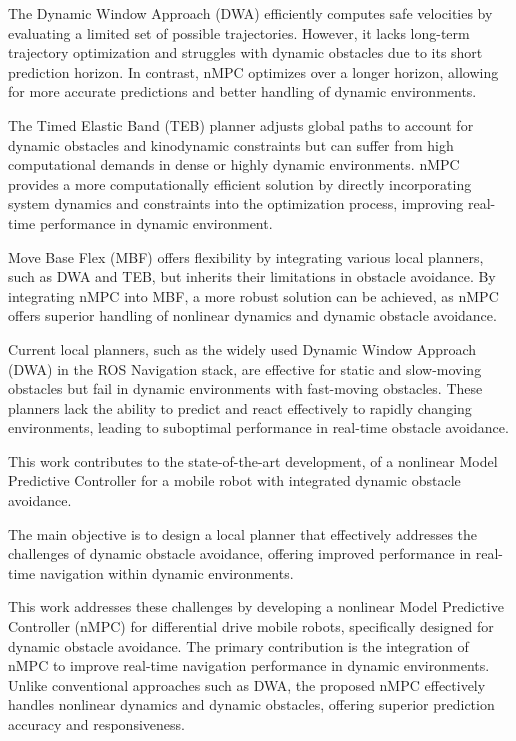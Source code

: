 \documentclass[conference]{IEEEtran}
\begin{document}
The Dynamic Window Approach (DWA) efficiently computes safe velocities by evaluating a limited set of possible trajectories. However, it lacks long-term trajectory optimization and struggles with dynamic obstacles due to its short prediction horizon. In contrast, nMPC optimizes over a longer horizon, allowing for more accurate predictions and better handling of dynamic environments.

The Timed Elastic Band (TEB) planner adjusts global paths to account for dynamic obstacles and kinodynamic constraints but can suffer from high computational demands in dense or highly dynamic environments. nMPC provides a more computationally efficient solution by directly incorporating system dynamics and constraints into the optimization process, improving real-time performance in dynamic environment.

Move Base Flex (MBF) offers flexibility by integrating various local planners, such as DWA and TEB, but inherits their limitations in obstacle avoidance. By integrating nMPC into MBF, a more robust solution can be achieved, as nMPC offers superior handling of nonlinear dynamics and dynamic obstacle avoidance.

Current local planners, such as the widely used Dynamic Window Approach (DWA) in the ROS Navigation stack, are effective for static and slow-moving obstacles but fail in dynamic environments with fast-moving obstacles. These planners lack the ability to predict and react effectively to rapidly changing environments, leading to suboptimal performance in real-time obstacle avoidance.

This work contributes to the state-of-the-art development, of a nonlinear Model Predictive Controller for a mobile robot with integrated dynamic obstacle avoidance. 

The main objective is to design a local planner that effectively addresses the challenges of dynamic obstacle avoidance, offering improved performance in real-time navigation within dynamic environments.

This work addresses these challenges by developing a nonlinear Model Predictive Controller (nMPC) for differential drive mobile robots, specifically designed for dynamic obstacle avoidance. The primary contribution is the integration of nMPC to improve real-time navigation performance in dynamic environments. Unlike conventional approaches such as DWA, the proposed nMPC effectively handles nonlinear dynamics and dynamic obstacles, offering superior prediction accuracy and responsiveness.
\end{document}
